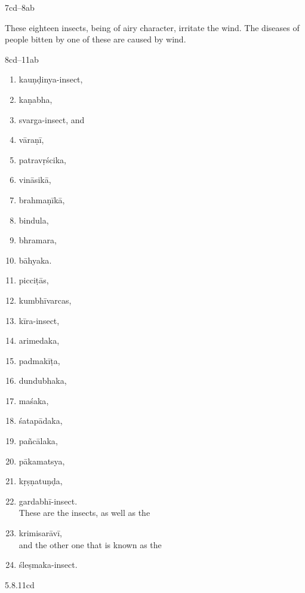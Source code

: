 \begin{translation}
\item[7cd--8ab]

These eighteen insects, being of airy character, irritate the
wind.
The diseases of people bitten by one of these are caused by wind.

\item[8cd--11ab]
\begin{multicols}{2}
    \begin{enumerate}
        \item \Gls{kauṇḍinya-insect},
        \item \Gls{kaṇabha},
        \item \Gls{svarga-insect}, and
        \item \Gls{vāraṇī},
         \item \Gls{patravṛścika},
        \item \Gls{vināsikā},
        \item \Gls{brahmaṇīkā},
        \item \Gls{bindula},
        \item \Gls{bhramara},
        \item \Gls{bāhyaka}.
        \item \Glspl{picciṭā}, 
        \item \Gls{kumbhīvarcas}, 
        \item \Gls{kīra-insect}, 
        \item \Gls{arimedaka},
        \item \Gls{padmakīṭa},
        \item \Gls{dundubhaka},
        \item \Gls{maśaka},
        \item \Gls{śatapādaka},
        \item \Gls{pañcālaka},
        \item \Gls{pākamatsya},\label{pakamatsya}
        \item \Gls{kṛṣṇatuṇḍa},
        \item \Gls{gardabhī-insect}.\\
                These are the insects, as well as the 
        \item \Gls{krimisarāvī},\\ and the 
        other one that is known as the
        \item \Gls{śleṣmaka-insect}.       
        \end{enumerate}
    \end{multicols}

\item[5.8.11cd]


\end{translation}

